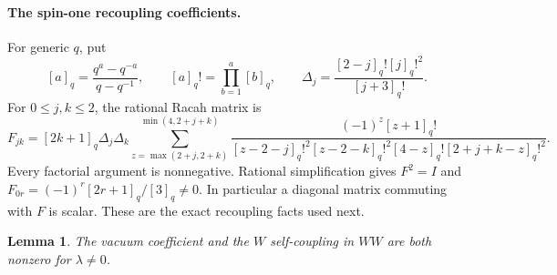 \documentclass[11pt]{article}
\newtheorem{lemma}[theorem]{Lemma}
\numberwithin{equation}{section}
\begin{document}
\paragraph{The spin-one recoupling coefficients.}
For generic $q$, put
\[
[a]_q=\frac{q^a-q^{-a}}{q-q^{-1}},\qquad [a]_q!=\prod_{b=1}^a[b]_q,\qquad
\Delta_j=\frac{[2-j]_q![j]_q!^2}{[j+3]_q!}.
\]
For $0\leq j,k\leq2$, the rational Racah matrix is
\[
F_{jk}=[2k+1]_q\Delta_j\Delta_k
\sum_{z=\max(2+j,2+k)}^{\min(4,2+j+k)}
\frac{(-1)^z[z+1]_q!}{[z-2-j]_q!^2[z-2-k]_q!^2[4-z]_q![2+j+k-z]_q!^2}.
\]
Every factorial argument is nonnegative. Rational simplification gives $F^2=I$ and
$F_{0r}=(-1)^r[2r+1]_q/[3]_q\ne0$. In particular a diagonal matrix commuting with $F$ is scalar. These are the exact recoupling facts used next.

\begin{lemma}\label{A:lat:coupling}
The vacuum coefficient and the $W$ self-coupling in $WW$ are both nonzero for $\lambda\ne0$.
\end{lemma}
\end{document}
